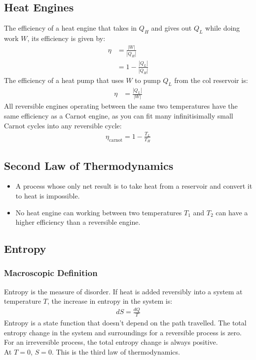 \documentclass[11pt, letterpaper]{article}
\begin{document}
\begin{multicols*}{3}
\subsection{Heat Engines}
The efficiency of a heat engine that takes in $Q_H$ and gives out $Q_L$ while doing work $W$, its efficiency is given by:
\begin{align*}
  \eta &= \frac{|W|}{|Q_H|} \\
  &= 1 - \frac{|Q_L|}{|Q_H|}
\end{align*}
The efficiency of a heat pump that uses $W$ to pump $Q_L$ from the col reservoir is:
\begin{align*}
  \eta &= \frac{|Q_L|}{|W|}
\end{align*}
All reversible engines operating between the same two temperatures have the same efficiency as a Carnot engine, as you can fit many infinitisimally small Carnot cycles into any reversible cycle:
\begin{align*}
  \eta_{\text{carnot}} = 1 - \frac{T_L}{T_H}
\end{align*}

\subsection{Second Law of Thermodynamics}
\begin{itemize}
\item A process whose only net result is to take heat from a reservoir and convert it to heat is impossible. 
\item No heat engine can working between two temperatures $T_1$ and $T_2$  can have a higher efficiency than a reversible engine.
\end{itemize}

\subsection{Entropy}
\subsubsection{Macroscopic Definition}
Entropy is the measure of disorder. If heat is added reversibly into a system at temperature $T$, the increase in entropy in the system is:
\begin{align*}
  dS = \frac{dQ}{T}
\end{align*}
Entropy is a state function that doesn't depend on the path travelled. The total entropy change in the system and surroundings for a reversible process is zero. For an irreversible process, the total entropy change is always positive. 
\\
\noindent
At $T=0$, $S=0$. This is the third law of thermodynamics. 

\end{multicols*}
\end{document}

